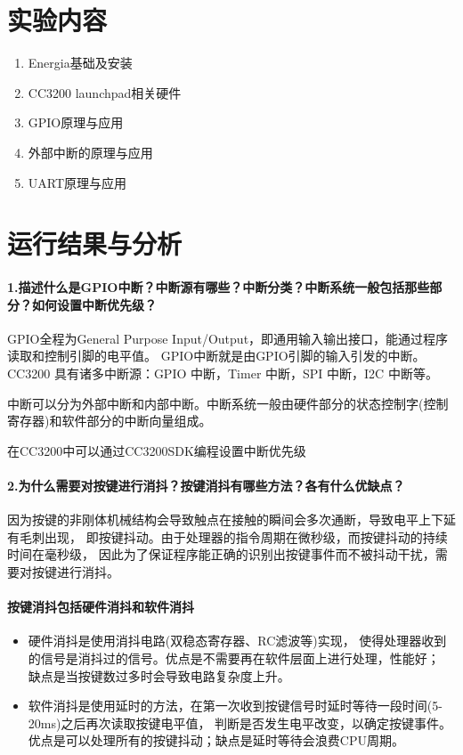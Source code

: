 \documentclass[a4paper]{ctexart}
\begin{document}
  \section{实验内容}
  \begin{enumerate}
    \item Energia基础及安装
    \item CC3200 launchpad相关硬件
    \item GPIO原理与应用
    \item 外部中断的原理与应用
    \item UART原理与应用
  \end{enumerate}

  \section{运行结果与分析}
  \paragraph{1.描述什么是GPIO中断？中断源有哪些？中断分类？中断系统一般包括那些部分？如何设置中断优先级？\\}

  \quad GPIO全程为General Purpose Input/Output，即通用输入输出接口，能通过程序读取和控制引脚的电平值。
  GPIO中断就是由GPIO引脚的输入引发的中断。
  CC3200 具有诸多中断源：GPIO 中断，Timer 中断，SPI 中断，I2C 中断等。

  中断可以分为外部中断和内部中断。中断系统一般由硬件部分的状态控制字(控制寄存器)和软件部分的中断向量组成。

  在CC3200中可以通过CC3200SDK编程设置中断优先级

  \paragraph{2.为什么需要对按键进行消抖？按键消抖有哪些方法？各有什么优缺点？\\}

  \quad 因为按键的非刚体机械结构会导致触点在接触的瞬间会多次通断，导致电平上下延有毛刺出现，
  即按键抖动。由于处理器的指令周期在微秒级，而按键抖动的持续时间在毫秒级，
  因此为了保证程序能正确的识别出按键事件而不被抖动干扰，需要对按键进行消抖。

  \paragraph{按键消抖包括硬件消抖和软件消抖}
  \begin{itemize}
    \item 硬件消抖是使用消抖电路(双稳态寄存器、RC滤波等)实现，
    使得处理器收到的信号是消抖过的信号。优点是不需要再在软件层面上进行处理，性能好；
    缺点是当按键数过多时会导致电路复杂度上升。
    \item 软件消抖是使用延时的方法，在第一次收到按键信号时延时等待一段时间(5-20ms)之后再次读取按键电平值，
    判断是否发生电平改变，以确定按键事件。优点是可以处理所有的按键抖动；缺点是延时等待会浪费CPU周期。
  \end{itemize}
\end{document}
